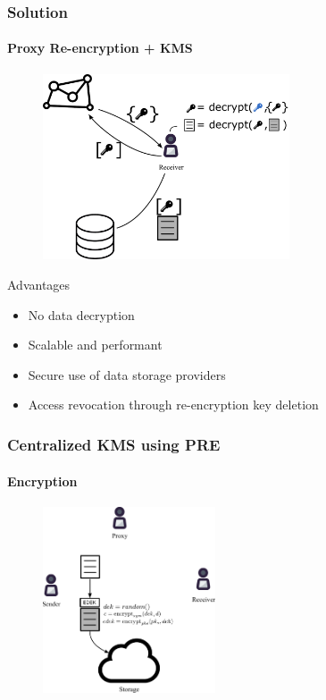\documentclass[xetex,mathsans,sans]{beamer}
\begin{document}
    \begin{frame}
        \frametitle{Solution}
        \framesubtitle{Proxy Re-encryption + KMS}
        \begin{figure}
            \centering
            \includegraphics[height=5.5cm]{pdf/pre-kms.pdf}
        \end{figure}

        Advantages
        \begin{itemize}
            \item No data decryption
            \item Scalable and performant
            \item Secure use of data storage providers
            \item Access revocation through re-encryption key deletion
        \end{itemize}
    \end{frame}

    \begin{frame}
        \frametitle{Centralized KMS using PRE}
        \framesubtitle{Encryption}
        \begin{figure}
            \centering
            \includegraphics[height=5.5cm]{pdf/encrypt.pdf}
        \end{figure}
    \end{frame}
\end{document}
